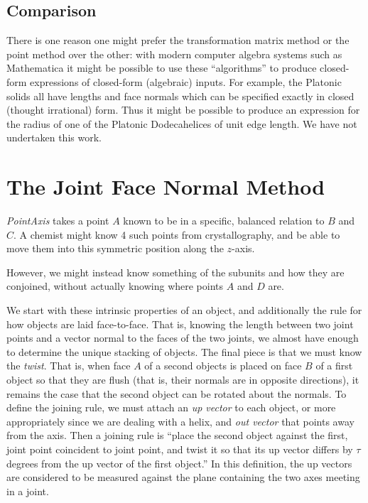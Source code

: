 \documentclass[11pt]{article}
\begin{document}
{\subsection{Comparison}

There is one reason one might prefer the transformation matrix method or the point method over the other: with modern
computer algebra systems such as Mathematica\cite{Mathematica} it might be possible to use these ``algorithms'' to produce closed-form
expressions of closed-form (algebraic) inputs. For example, the Platonic solids all have lengths and face normals which
can be specified exactly in closed (thought irrational) form. Thus it might be possible to produce an expression for the
radius of one of the Platonic Dodecahelices of unit edge length. We have not undertaken this work.


\section{The Joint Face Normal Method}
\label{sec:facenormal}

{\em PointAxis} takes a point $A$ known to be in a specific, balanced relation
to $B$ and $C$. A chemist might know 4 such points from crystallography,
and be able to move them into this symmetric position along the $z$-axis.

However, we might instead know something of the subunits and
how they are conjoined, without actually knowing where points $A$
and $D$ are.

We start with these intrinsic properties of an object, and additionally the
rule for how objects are laid face-to-face. That is, knowing the length between two
joint points and a vector normal to the faces of the two joints, we almost have
enough to determine the unique stacking of objects. The final piece is that we must
know the {\em twist}. That is, when face $A$ of a second objects is placed on face $B$
of a first object so that they are flush (that is, their normals are in opposite directions),
it remains the case that the second object can be rotated about the normals. To
define the joining rule, we must attach an {\em up vector} to each object, or more appropriately
since we are dealing with a helix, and {\em out vector} that points away from the axis. Then a joining
rule is ``place the second object against the first, joint point coincident to joint point,
and twist it so that its up vector differs by $\tau$ degrees from the up vector of the first
object.'' In this definition, the up vectors are considered to be measured against the plane
containing the two axes meeting in a joint.

}
\end{document}
